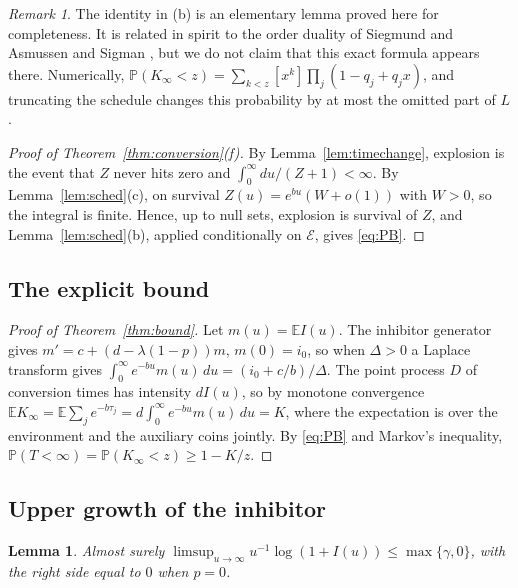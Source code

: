\documentclass[11pt,a4paper]{article}
\numberwithin{equation}{section}
\newtheorem{lemma}[theorem]{Lemma}
\theoremstyle{definition}\newtheorem{definition}[theorem]{Definition}
\theoremstyle{remark}\newtheorem{remark}[theorem]{Remark}\newtheorem{example}[theorem]{Example}
\newcommand{\E}{\mathbb E}
\renewcommand{\P}{\mathbb P}
\begin{document}
\begin{remark}
The identity in (b) is an elementary lemma proved here for completeness. It is related in spirit to the order duality of Siegmund \cite{Siegmund1976} and Asmussen and Sigman \cite{AsmussenSigman1996}, but we do not claim that this exact formula appears there. Numerically, $\P(K_\infty<z)=\sum_{k<z}[x^k]\prod_j(1-q_j+q_jx)$, and truncating the schedule changes this probability by at most the omitted part of $L$.
\end{remark}

\begin{proof}[Proof of Theorem~\ref{thm:conversion}(f)]
By Lemma~\ref{lem:timechange}, explosion is the event that $Z$ never hits zero and $\int_0^\infty du/(Z+1)<\infty$. By Lemma~\ref{lem:sched}(c), on survival $Z(u)=e^{bu}(W+o(1))$ with $W>0$, so the integral is finite. Hence, up to null sets, explosion is survival of $Z$, and Lemma~\ref{lem:sched}(b), applied conditionally on $\mathcal E$, gives \eqref{eq:PB}.
\end{proof}

\subsection{The explicit bound}\label{sec:bound}
\begin{proof}[Proof of Theorem~\ref{thm:bound}]
Let $m(u)=\E I(u)$. The inhibitor generator gives $m'=c+(d-\lambda(1-p))m$, $m(0)=i_0$, so when $\Delta>0$ a Laplace transform gives $\int_0^\infty e^{-bu}m(u)\,du=(i_0+c/b)/\Delta$. The point process $D$ of conversion times has intensity $dI(u)$, so by monotone convergence $\E K_\infty=\E\sum_je^{-b\tau_j}=d\int_0^\infty e^{-bu}m(u)\,du=K$, where the expectation is over the environment and the auxiliary coins jointly. By \eqref{eq:PB} and Markov's inequality, $\P(T<\infty)=\P(K_\infty<z)\ge1-K/z$.
\end{proof}

\subsection{Upper growth of the inhibitor}\label{sec:upper}
\begin{lemma}\label{lem:upper}
Almost surely $\limsup_{u\to\infty}u^{-1}\log(1+I(u))\le\max\{\gamma,0\}$, with the right side equal to $0$ when $p=0$.
\end{lemma}
\end{document}
